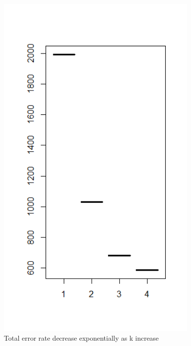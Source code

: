 \documentclass{article}
\begin{document}
\begin{figure}
  \includegraphics[width=100mm, scale = 0.5]{SSE.png}
  \caption{Total error rate decrease exponentially as k increase}
\end{figure}
\pagebreak
\end{document}
